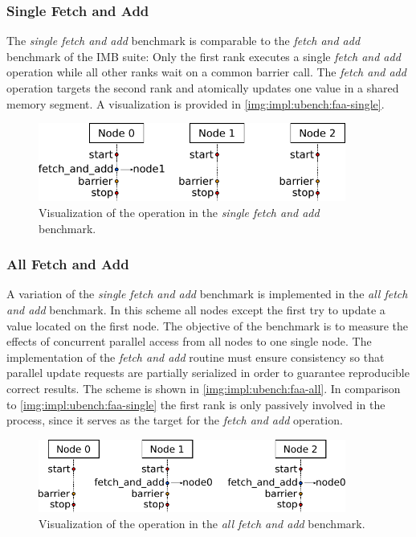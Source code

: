 \subsubsection*{Single Fetch and Add}

The \emph{single fetch and add} benchmark is comparable to the \emph{fetch and add} benchmark of the \ac{IMB} suite: Only the first rank executes a single \emph{fetch and add} operation while all other ranks wait on a common barrier call. The \emph{fetch and add} operation targets the second rank and atomically updates one value in a shared memory segment. A visualization is provided in \autoref{img:impl:ubench:faa-single}.

\begin{figure}[htb]
\centering
\includegraphics[width=0.9\textwidth]{img/bench-atomic-faa-single}
\caption{Visualization of the operation in the \emph{single fetch and add} benchmark.}
\label{img:impl:ubench:faa-single}
\end{figure}

\subsubsection*{All Fetch and Add}

A variation of the \emph{single fetch and add} benchmark is implemented in the \emph{all fetch and add} benchmark. In this scheme all nodes except the first try to update a value located on the first node. The objective of the benchmark is to measure the effects of concurrent parallel access from all nodes to one single node. The implementation of the \emph{fetch and add} routine must ensure consistency so that parallel update requests are partially serialized  in order to guarantee reproducible correct results. The scheme is shown in \autoref{img:impl:ubench:faa-all}. In comparison to \autoref{img:impl:ubench:faa-single} the first rank is only passively involved in the process, since it serves as the target for the \emph{fetch and add} operation.

\begin{figure}[htb]
\centering
\includegraphics[width=0.9\textwidth]{img/bench-atomic-faa-all}
\caption{Visualization of the operation in the \emph{all fetch and add} benchmark.}
\label{img:impl:ubench:faa-all}
\end{figure}

